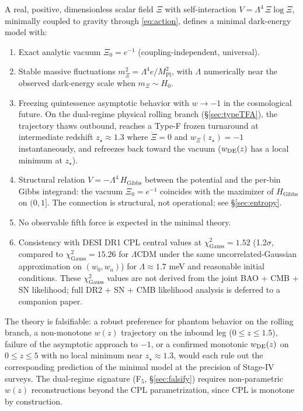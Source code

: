 \documentclass[11pt,reqno]{amsart}
\theoremstyle{plain}
\theoremstyle{definition}
\theoremstyle{remark}
\newcommand{\Pl}{\mathrm{Pl}}
\newcommand{\Gibbs}{\mathrm{Gibbs}}
\begin{document}
A real, positive, dimensionless scalar field $\Xi$ with self-interaction
$V = \Lambda^{4}\,\Xi\log\Xi$, minimally coupled to gravity through
\eqref{eq:action}, defines a minimal dark-energy model with:
\begin{enumerate}
  \item Exact analytic vacuum $\Xi_0 = e^{-1}$
        (coupling-independent, universal).
  \item Stable massive fluctuations $m_\Xi^{2} = \Lambda^{4} e / M_\Pl^{2}$,
        with $\Lambda$ numerically near the observed dark-energy scale
        when $m_\Xi \sim H_0$.
  \item Freezing quintessence asymptotic behavior with $w \to -1$ in
        the cosmological future. On the dual-regime physical rolling
        branch (\S\ref{sec:typeTFA}), the trajectory thaws outbound,
        reaches a Type-F frozen turnaround at intermediate redshift
        $z_\star \approx 1.3$ where $\dot\Xi = 0$ and $w_\Xi(z_\star) = -1$
        instantaneously, and refreezes back toward the vacuum
        ($w_{\rm DE}(z)$ has a local minimum at $z_\star$).
  \item Structural relation $V = -\Lambda^{4}\,H_{\Gibbs}$ between the
        potential and the per-bin Gibbs integrand: the vacuum
        $\Xi_0 = e^{-1}$ coincides with the maximizer of $H_{\Gibbs}$
        on $(0,1]$. The connection is structural, not operational; see
        \S\ref{sec:entropy}.
  \item No observable fifth force is expected in the minimal theory.
  \item Consistency with DESI DR1 CPL central values at
        $\chi^{2}_{\text{Gauss}} = 1.52$ (1.2$\sigma$, compared to
        $\chi^{2}_{\text{Gauss}} = 15.26$ for $\Lambda$CDM under the
        same uncorrelated-Gaussian approximation on $(w_0,w_a)$) for
        $\Lambda \approx 1.7$ meV and reasonable initial conditions.
        These $\chi^{2}_{\text{Gauss}}$ values are not derived from the
        joint BAO + CMB + SN likelihood; full DR2 + SN + CMB likelihood
        analysis is deferred to a companion paper.
\end{enumerate}
The theory is falsifiable: a robust preference for phantom behavior on
the rolling branch, a non-monotone $w(z)$ trajectory on the inbound leg
($0 \leq z \leq 1.5$), failure of the asymptotic approach to $-1$, or
a confirmed monotonic $w_{\rm DE}(z)$ on $0 \leq z \leq 5$ with no local
minimum near $z_\star \approx 1.3$, would each rule out the corresponding
prediction of the minimal model at the precision of Stage-IV surveys.
The dual-regime signature (F$_5$, \S\ref{sec:falsify}) requires
non-parametric $w(z)$ reconstructions beyond the CPL parametrization,
since CPL is monotone by construction.
\end{document}
